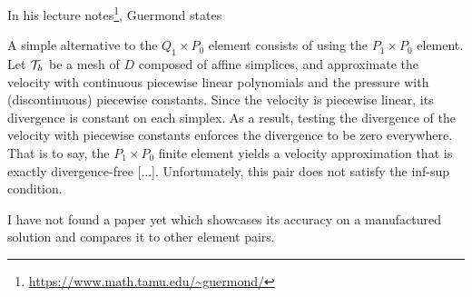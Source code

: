 In his lecture notes\footnote{\url{https://www.math.tamu.edu/~guermond/}}, 
Guermond states 
\begin{displayquote}
{\color{darkgray}
A simple alternative to the 
$Q_1\times P_0$ element consists of using the $P_1\times P_0$ element.
Let ${\cal T}_h$  be a mesh of $D$ composed of affine simplices, and approximate the 
velocity with continuous piecewise linear polynomials and the pressure with
(discontinuous) piecewise constants. Since the velocity is piecewise linear, its
divergence is constant on each simplex. As a result, testing the divergence
of the velocity with piecewise constants enforces the divergence to be zero
everywhere. That is to say, the $P_1\times P_0$ finite element yields a velocity 
approximation that is exactly divergence-free [...]. Unfortunately,
this pair does not satisfy the inf-sup condition.}
\end{displayquote}

I have not found a paper yet which showcases its accuracy on a manufactured solution
and compares it to other element pairs.



